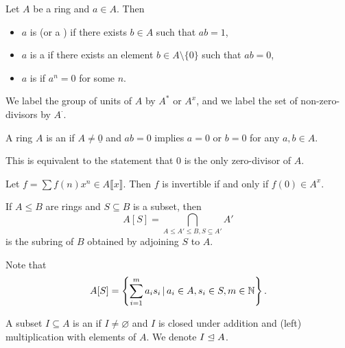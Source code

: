 \begin{definition}
  Let $A$ be a ring and $a \in A$.
  Then
  \begin{itemize}
  \item $a$ is  (or a ) if there exists
	$b \in A$ such that $ab = 1$,
  \item $a$ is a  if there exists an element $b \in A \setminus
	\{0\}$ such that $ab = 0$,
  \item $a$ is  if $a^n = 0$ for some $n$.
  \end{itemize}
\end{definition}

\begin{definition}
  We label the group of units of $A$ by $A^*$ or $A^x$, and we label the set of
  non-zero-divisors by $A^\cdot$.
\end{definition}

\begin{definition}
  A ring $A$ is an  if $A \ne \underline{0}$ and $ab =
  0$ implies $a = 0$ or $b = 0$ for any $a, b \in A$.
\end{definition}

\begin{remark}
  This is equivalent to the statement that $0$ is the only zero-divisor of $A$.
\end{remark}

\begin{example}
  Let $f = \sum f(n) x^n \in A\llbracket x \rrbracket$.
  Then $f$ is invertible if and only if $f(0) \in A^x$.
\end{example}

\begin{definition}
  If $A \le B$ are rings and $S \subseteq B$ is a subset, then
  \[
	A[S] = \bigcap_{A \le A' \le B, S \subseteq A'} A'
  \]
  is the subring of $B$ obtained by adjoining $S$ to $A$.
\end{definition}

\begin{remark}
  Note that
  \[
	A[S] = \left\{ \sum_{i=1}^m a_i s_i \,|\, a_i \in A, s_i \in S, m \in \mathbb{N}
	\right\}.
  \]
\end{remark}

\begin{definition}
  A subset $I \subseteq A$ is an  if $I \ne \varnothing$ and $I$
  is closed under addition and (left) multiplication with elements of $A$.
  We denote $I \trianglelefteq A$.
\end{definition}

